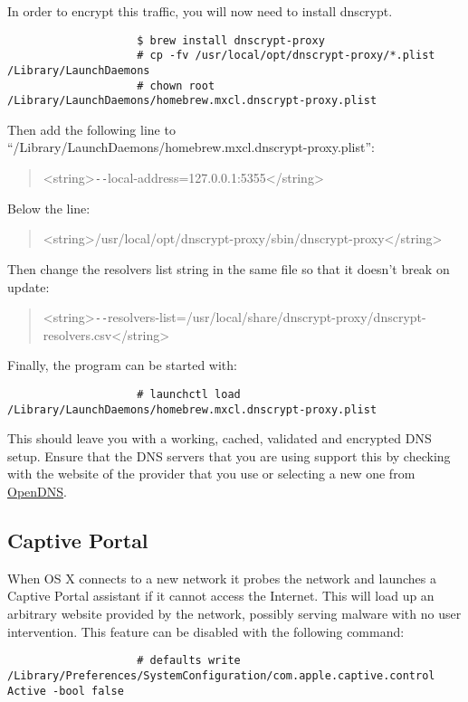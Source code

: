 				In order to encrypt this traffic, you will now need to install dnscrypt.
				\begin{verbatim}
					$ brew install dnscrypt-proxy
					# cp -fv /usr/local/opt/dnscrypt-proxy/*.plist /Library/LaunchDaemons
					# chown root /Library/LaunchDaemons/homebrew.mxcl.dnscrypt-proxy.plist
				\end{verbatim}
				Then add the following line to ``/Library/LaunchDaemons/homebrew.mxcl.dnscrypt-proxy.plist'':
				\begin{quote}
					<string>\verb+--+local-address=127.0.0.1:5355</string>
				\end{quote}
				Below the line:
				\begin{quote}
					<string>/usr/local/opt/dnscrypt-proxy/sbin/dnscrypt-proxy</string>
				\end{quote}
				Then change the resolvers list string in the same file so that it doesn't break on update:
				\begin{quote}
					<string>\verb+--+resolvers-list=/usr/local/share/dnscrypt-proxy/dnscrypt-resolvers.csv</string>
				\end{quote}
				Finally, the program can be started with:
				\begin{verbatim}
					# launchctl load /Library/LaunchDaemons/homebrew.mxcl.dnscrypt-proxy.plist
				\end{verbatim}

				This should leave you with a working, cached, validated and encrypted DNS setup.
				Ensure that the DNS servers that you are using support this by checking with the website of the provider that you use or
				selecting a new one from \href{https://www.opendns.com/}{OpenDNS}.

			\subsection{Captive Portal}
				When OS X connects to a new network it probes the network and launches a Captive Portal assistant if it cannot access the Internet.
				This will load up an arbitrary website provided by the network, possibly serving malware with no user intervention.
				This feature can be disabled with the following command:
				\begin{verbatim}
					# defaults write /Library/Preferences/SystemConfiguration/com.apple.captive.control Active -bool false
				\end{verbatim}

